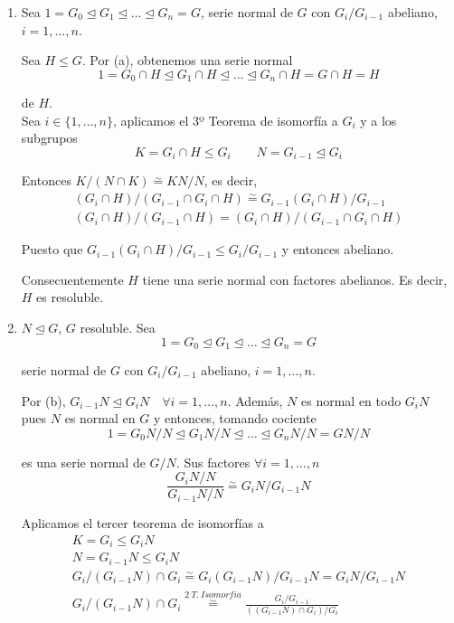 \documentclass{article}
\begin{document}
\begin{enumerate}[1)]
\item Sea $1=G_0\unlhd G_1\unlhd \ldots\unlhd G_n=G$, serie normal de $G$ con $G_i/G_{i-1}$ abeliano, $i=1,\ldots,n$. 

Sea $H\leq G$. Por (a), obtenemos una serie normal
\begin{equation*}
1=G_0\cap H\unlhd G_1\cap H\unlhd \ldots\unlhd G_n\cap H=G\cap H=H
\end{equation*}

de $H$. \\

Sea $i\in \{1,\ldots,n\}$, aplicamos el 3º Teorema de isomorfía a $G_i$ y a los subgrupos
\begin{equation*}
K=G_i\cap H\leq G_i\qquad N=G_{i-1}\unlhd G_i
\end{equation*}

Entonces $K/(N\cap K)\overset{\sim}{=} KN/N$, es decir,
\begin{gather*}
(G_i\cap H)/(G_{i-1}\cap G_i\cap H)\overset{\sim}{=} G_{i-1}(G_i\cap H)/G_{i-1} \\
(G_i\cap H)/(G_{i-1}\cap H)=(G_i\cap H)/(G_{i-1}\cap G_i\cap H)
\end{gather*}

Puesto que $G_{i-1}(G_i\cap H)/G_{i-1}\leq G_i/G_{i-1}$ y entonces abeliano.

Consecuentemente $H$ tiene una serie normal con factores abelianos. Es decir, $H$ es resoluble.

\item $N\unlhd G$, $G$ resoluble. Sea
\begin{equation*}
1=G_0\unlhd G_1\unlhd \ldots\unlhd G_n=G
\end{equation*}

serie normal de $G$ con $G_i/G_{i-1}$ abeliano, $i=1,\ldots,n$. 

Por (b), $G_{i-1}N\unlhd G_iN\quad \forall i=1,\ldots,n$. Además, $N$ es normal en todo $G_iN$ pues $N$ es normal en $G$ y entonces, tomando cociente
\begin{equation*}
1=G_0N/N\unlhd G_1N/N\unlhd \ldots\unlhd G_nN/N=GN/N
\end{equation*}

es una serie normal de $G/N$. Sus factores $\forall i=1,\ldots,n$
\begin{equation*}
\frac{G_iN/N}{G_{i-1}N/N}\overset{\sim}{=} G_iN/G_{i-1}N
\end{equation*}

Aplicamos el tercer teorema de isomorfías a
\begin{gather*}
K=G_i\leq G_iN \\
N=G_{i-1}N\leq G_iN \\
G_i/(G_{i-1}N)\cap G_i\overset{\sim}{=} G_i(G_{i-1}N)/G_{i-1}N=G_iN/G_{i-1}N \\
G_i/(G_{i-1}N)\cap G_i\overset{2\:T.\:Isomorfia}{\overset{\sim}{=}} \frac{G_i/G_{i-1}}{((G_{i-1}N)\cap G_i)/G_i}
\end{gather*}


\end{enumerate}
\end{document}
